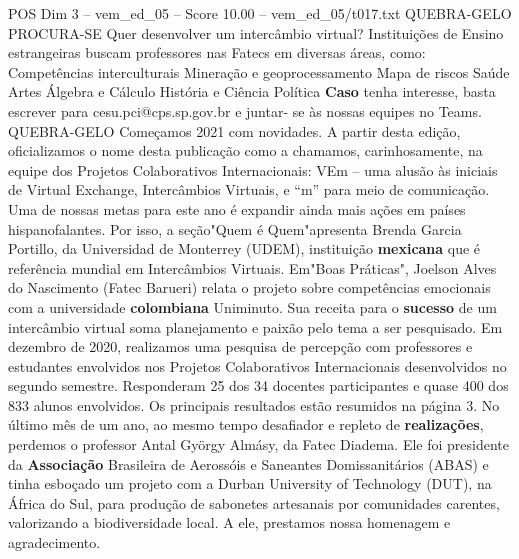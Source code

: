 \begin{textsample}{POS Dim 3 – vem\_ed\_05 – Score 10.00 – vem\_ed\_05/t017.txt}  \label{ex:f3_pos_121}
QUEBRA-GELO PROCURA-SE Quer desenvolver um intercâmbio virtual?
Instituições de Ensino estrangeiras buscam professores nas Fatecs em diversas áreas, como: Competências interculturais Mineração e geoprocessamento Mapa de riscos Saúde Artes Álgebra e Cálculo História e Ciência Política \textbf{Caso} tenha interesse, basta escrever para cesu.pci@cps.sp.gov.br e juntar- se às nossas equipes no Teams.
QUEBRA-GELO Começamos 2021 com novidades.
A partir desta edição, oficializamos o nome desta publicação como a chamamos, carinhosamente, na equipe dos Projetos Colaborativos Internacionais: VEm – uma alusão às iniciais de Virtual Exchange, Intercâmbios Virtuais, e “m” para meio de comunicação.
Uma de nossas metas para este ano é expandir ainda mais ações em países hispanofalantes.
Por isso, a seção"Quem é Quem"apresenta Brenda Garcia Portillo, da Universidad de Monterrey (UDEM), instituição \textbf{mexicana} que é referência mundial em Intercâmbios Virtuais.
Em"Boas Práticas", Joelson Alves do Nascimento (Fatec Barueri) relata o projeto sobre competências emocionais com a universidade \textbf{colombiana} Uniminuto.
Sua receita para o \textbf{sucesso} de um intercâmbio virtual soma planejamento e paixão pelo tema a ser pesquisado.
Em dezembro de 2020, realizamos uma pesquisa de percepção com professores e estudantes envolvidos nos Projetos Colaborativos Internacionais desenvolvidos no segundo semestre.
Responderam 25 dos 34 docentes participantes e quase 400 dos 833 alunos envolvidos.
Os principais resultados estão resumidos na página 3.
No último mês de um ano, ao mesmo tempo desafiador e repleto de \textbf{realizações}, perdemos o professor Antal György Almásy, da Fatec Diadema.
Ele foi presidente da \textbf{Associação} Brasileira de Aerossóis e Saneantes Domissanitários (ABAS) e tinha esboçado um projeto com a Durban University of Technology (DUT), na África do Sul, para produção de sabonetes artesanais por comunidades carentes, valorizando a biodiversidade local.
A ele, prestamos nossa homenagem e agradecimento.

\end{textsample}
